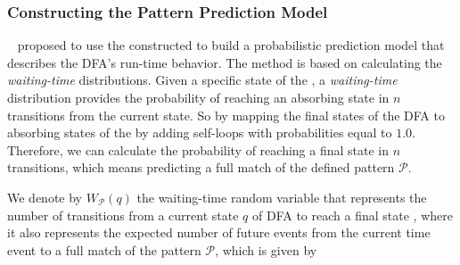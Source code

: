 \begin{itemize}[noitemsep]
 
\end{itemize}




\subsubsection*{Constructing the Pattern Prediction Model}
\label{sec:pmc_prediction}

~\citet{alevizos2017event} proposed to use the constructed \pmcmr to build a probabilistic prediction model that describes the DFA's run-time behavior. The method is based on calculating the \textit{waiting-time} distributions. Given a specific state of the \pmcmr, a \textit{waiting-time} distribution provides the probability of reaching an absorbing state in $n$ transitions from the current state. So by mapping the final states of the DFA to absorbing states of the \pmcmr by adding self-loops with probabilities equal to $1.0$. Therefore, we can calculate the probability of reaching a final state in $n$ transitions, which means predicting a full match of the defined pattern $\mathcal{P}$.

\par We denote by $W_{\mathcal{P}}(q)$ the waiting-time random variable that represents the number of transitions from a current state $q$ of DFA to reach a final state \cite{alevizos2017event}, where it also represents the expected number of future events from the current time event to a full match of the pattern $\mathcal{P}$, which is given by 

